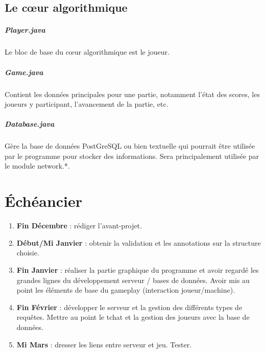 \documentclass[a4paper,12pt]{report}
\begin{document}
\section{Le c\oe{}ur algorithmique}
\paragraph{Player.java}
Le bloc de base du c\oe{}ur algorithmique est le joueur. 
\paragraph{Game.java}
Contient les données principales pour une partie, notamment l'état des scores, les joueurs y participant, l'avancement de la partie, etc.
\paragraph{Database.java}
Gère la base de données PostGreSQL ou bien textuelle qui pourrait être utilisée par le programme pour stocker des informations. Sera principalement utilisée par le module network.*.

\chapter{Échéancier}
\begin{enumerate}
    \item \textbf{Fin Décembre} : rédiger l'avant-projet.
    \item \textbf{Début/Mi Janvier} : obtenir la validation et les annotations sur la structure choisie.
    \item \textbf{Fin Janvier} : réaliser la partie graphique du programme et avoir regardé les grandes lignes du développement serveur / bases de données. Avoir mis au point les éléments de base du gameplay (interaction joueur/machine).
    \item \textbf{Fin Février} : développer le serveur et la gestion des différents types de requêtes. Mettre au point le tchat et la gestion des joueurs avec la base de données.
    \item \textbf{Mi Mars} : dresser les liens entre serveur et jeu. Tester.
\end{enumerate}
\end{document}
